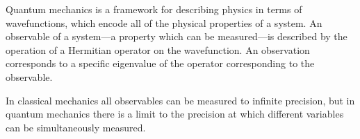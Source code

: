 
Quantum mechanics is a framework for describing physics in terms of
wavefunctions, which encode all of the physical properties of a
system. An observable of a system---a property which can be
measured---is described by the operation of a Hermitian operator on
the wavefunction. An observation corresponds to a specific eigenvalue
of the operator corresponding to the observable.

In classical mechanics all observables can be measured to infinite
precision, but in quantum mechanics there is a limit to the precision
at which different variables can be simultaneously measured.
